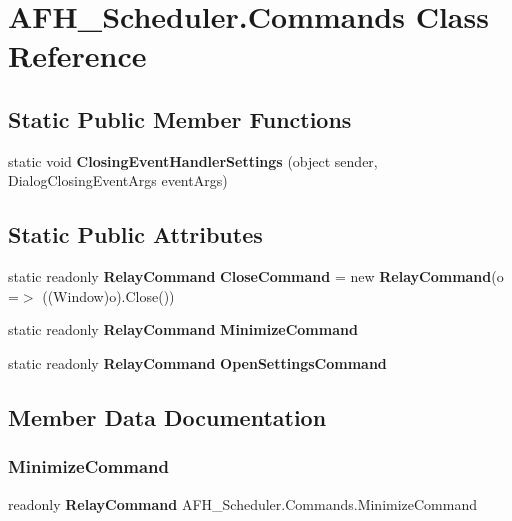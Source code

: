 \section{A\+F\+H\+\_\+\+Scheduler.\+Commands Class Reference}
\label{class_a_f_h___scheduler_1_1_commands}
\subsection*{Static Public Member Functions}
\begin{DoxyCompactItemize}
\item 
\mbox{\label{class_a_f_h___scheduler_1_1_commands_aa52a371f73558498c8ba1dd79b9f20a7}} 
static void {\bfseries Closing\+Event\+Handler\+Settings} (object sender, Dialog\+Closing\+Event\+Args event\+Args)
\end{DoxyCompactItemize}
\subsection*{Static Public Attributes}
\begin{DoxyCompactItemize}
\item 
\mbox{\label{class_a_f_h___scheduler_1_1_commands_a0e9a15fef4857a1fc327c55c4bd82b26}} 
static readonly \textbf{ Relay\+Command} {\bfseries Close\+Command} = new \textbf{ Relay\+Command}(o =$>$ ((Window)o).Close())
\item 
static readonly \textbf{ Relay\+Command} {\bfseries Minimize\+Command}
\item 
static readonly \textbf{ Relay\+Command} {\bfseries Open\+Settings\+Command}
\end{DoxyCompactItemize}


\subsection{Member Data Documentation}
\mbox{\label{class_a_f_h___scheduler_1_1_commands_ac129378d4c164a7ff5d5a3eed7eae7cc}} 
\subsubsection{MinimizeCommand}
{\footnotesize\ttfamily readonly \textbf{ Relay\+Command} A\+F\+H\+\_\+\+Scheduler.\+Commands.\+Minimize\+Command\hspace{0.3cm}{\ttfamily [static]}}

